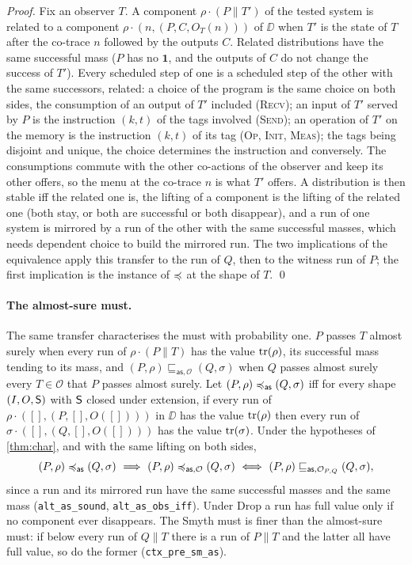 \begin{proof}
Fix an observer $T$. A component $\rho \cdot (P \parallel T')$ of the tested
system is related to a component $\rho \cdot (n,(P,C,O_T(n)))$ of $\DD$
when $T'$ is the state of $T$ after the co-trace $n$ followed by the
outputs $C$. Related distributions have the same successful mass ($P$ has
no $\mathbf{1}$, and the outputs of $C$ do not change the success of $T'$).
Every scheduled step of one is a scheduled step of the other with the
same successors, related: a choice of the program is the same choice on
both sides, the consumption of an output of $T'$ included (\textsc{Recv});
an input of $T'$ served by $P$ is the instruction $(k,t)$ of the tags
involved (\textsc{Send}); an operation of $T'$ on the memory is the
instruction $(k,t)$ of its tag (\textsc{Op}, \textsc{Init}, \textsc{Meas});
the tags being disjoint and unique, the choice determines the instruction
and conversely. The
consumptions commute with the other co-actions of the observer and keep its
other offers, so the menu at the co-trace $n$ is what $T'$ offers. A
distribution is then stable iff the related one is, the lifting of a
component is the lifting of the related one (both stay, or both are
successful or both disappear), and a run of one system is mirrored by a run
of the other with the same successful masses, which needs dependent choice
to build the mirrored run. The two implications of
the equivalence apply this transfer to the run of $Q$, then to the witness
run of $P$; the first implication is the instance of $\preccurlyeq$ at the shape of
$T$.
\qed
\end{proof}

\paragraph{The almost-sure must.} The same transfer characterises the
must with probability one. $P$ passes $T$ almost surely when every run of
$\rho \cdot (P \parallel T)$ has the value $\mathrm{tr}(\rho)$, its successful mass
tending to its mass, and $(P,\rho) \sqsubseteq_{\mathsf{as}, \mathcal{O}}
(Q,\sigma)$ when $Q$ passes almost surely every $T \in \mathcal{O}$ that
$P$ passes almost surely. Let $(P,\rho) \preccurlyeq_{\mathsf{as}} (Q,\sigma)$ iff
for every shape $(I, O, \mathsf{S})$ with $\mathsf{S}$ closed under extension, if
every run of $\rho \cdot ([],(P,[],O([])))$ in $\DD$ has the value
$\mathrm{tr}(\rho)$ then every run of $\sigma \cdot ([],(Q,[],O([])))$ has the value
$\mathrm{tr}(\sigma)$. Under the hypotheses of \cref{thm:char}, and with the same
lifting on both sides,
\[
(P,\rho) \preccurlyeq_{\mathsf{as}} (Q,\sigma)
\ \Longrightarrow\
(P,\rho) \preccurlyeq_{\mathsf{as}, \mathcal{O}} (Q,\sigma)
\ \Longleftrightarrow\
(P,\rho) \sqsubseteq_{\mathsf{as}, \mathcal{O}_{P,Q}} (Q,\sigma),
\]
since a run and its mirrored run have the same successful masses and the
same mass (\texttt{alt\_as\_sound}, \texttt{alt\_as\_obs\_iff}). Under Drop
a run has full value only if no component ever disappears. The Smyth must
is finer than the almost-sure must: if below every run of $Q \parallel T$
there is a run of $P \parallel T$ and the latter all have full value, so
do the former (\texttt{ctx\_pre\_sm\_as}).

